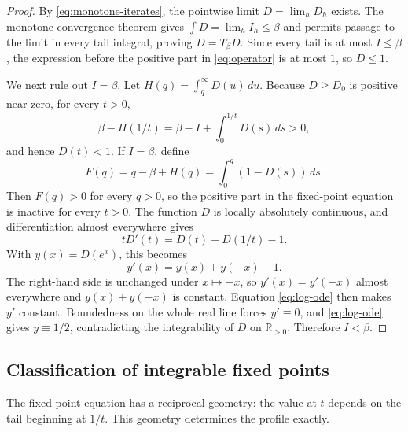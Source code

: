 \documentclass[11pt,letterpaper]{article}
\newcommand{\cref}[1]{\autoref{#1}}
\theoremstyle{definition}
\theoremstyle{remark}
\newcommand{\Rplus}{\mathbb{R}_{>0}}
\begin{document}
\begin{proof}
By \cref{eq:monotone-iterates}, the pointwise limit $D=\lim_hD_h$ exists.
The monotone convergence theorem gives $\int D=\lim_h I_h\le\beta$ and permits passage to the limit in every tail integral, proving $D=T_{\beta}D$.
Since every tail is at most $I\le\beta$, the expression before the positive part in \cref{eq:operator} is at most $1$, so $D\le1$.

We next rule out $I=\beta$.
Let $H(q)=\int_q^{\infty}D(u)\,du$.
Because $D\ge D_0$ is positive near zero, for every $t>0$,
\begin{equation}\label{eq:strict-below-one} \beta-H(1/t)=\beta-I+\int_0^{1/t}D(s)\,ds>0, \end{equation}
and hence $D(t)<1$.
If $I=\beta$, define
\begin{equation}\label{eq:F-equality} F(q)=q-\beta+H(q)=\int_0^q(1-D(s))\,ds. \end{equation}
Then $F(q)>0$ for every $q>0$, so the positive part in the fixed-point equation is inactive for every $t>0$.
The function $D$ is locally absolutely continuous, and differentiation almost everywhere gives
\begin{equation}\label{eq:reciprocal-ode} tD'(t)=D(t)+D(1/t)-1. \end{equation}
With $y(x)=D(e^x)$, this becomes
\begin{equation}\label{eq:log-ode} y'(x)=y(x)+y(-x)-1. \end{equation}
The right-hand side is unchanged under $x\mapsto-x$, so $y'(x)=y'(-x)$ almost everywhere and $y(x)+y(-x)$ is constant.
Equation \ref{eq:log-ode} then makes $y'$ constant.
Boundedness on the whole real line forces $y'\equiv0$, and \cref{eq:log-ode} gives $y\equiv1/2$, contradicting the integrability of $D$ on $\Rplus$.
Therefore $I<\beta$.
\end{proof}

\subsection{Classification of integrable fixed points}

The fixed-point equation has a reciprocal geometry: the value at $t$ depends on the tail beginning at $1/t$.
This geometry determines the profile exactly.
\end{document}
